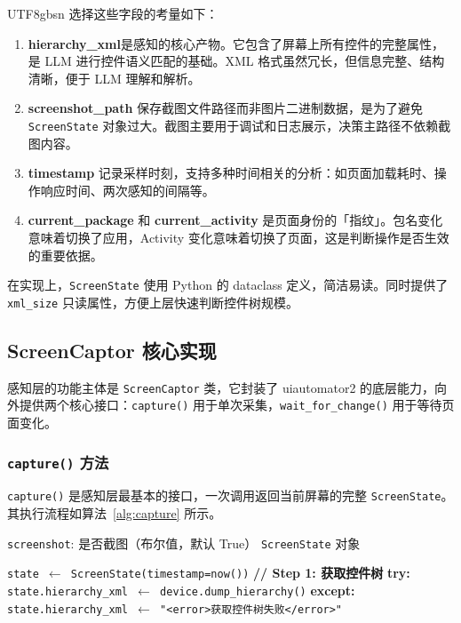 \documentclass{article}
\begin{document}
\begin{CJK}{UTF8}{gbsn}
选择这些字段的考量如下：

\begin{enumerate}[leftmargin=1.5em]
  \item \textbf{hierarchy\_xml}是感知的核心产物。它包含了屏幕上所有控件的完整属性，是 LLM 进行控件语义匹配的基础。XML 格式虽然冗长，但信息完整、结构清晰，便于 LLM 理解和解析。
  \item \textbf{screenshot\_path} 保存截图文件路径而非图片二进制数据，是为了避免 \texttt{ScreenState} 对象过大。截图主要用于调试和日志展示，决策主路径不依赖截图内容。
  \item \textbf{timestamp} 记录采样时刻，支持多种时间相关的分析：如页面加载耗时、操作响应时间、两次感知的间隔等。
  \item \textbf{current\_package} 和 \textbf{current\_activity} 是页面身份的「指纹」。包名变化意味着切换了应用，Activity 变化意味着切换了页面，这是判断操作是否生效的重要依据。
\end{enumerate}

在实现上，\texttt{ScreenState} 使用 Python 的 dataclass 定义，简洁易读。同时提供了 \texttt{xml\_size} 只读属性，方便上层快速判断控件树规模。

\subsection{ScreenCaptor 核心实现}

感知层的功能主体是 \texttt{ScreenCaptor} 类，它封装了 uiautomator2 的底层能力，向外提供两个核心接口：\texttt{capture()} 用于单次采集，\texttt{wait\_for\_change()} 用于等待页面变化。

\subsubsection{\texttt{capture()} 方法}

\texttt{capture()} 是感知层最基本的接口，一次调用返回当前屏幕的完整 \texttt{ScreenState}。其执行流程如算法~\ref{alg:capture} 所示。

\begin{algorithm}[h]
  \caption{\texttt{ScreenCaptor.capture()} 算法}
  \label{alg:capture}
  \begin{algorithmic}[1]
    \REQUIRE \texttt{screenshot}: 是否截图（布尔值，默认 True）
    \ENSURE \texttt{ScreenState} 对象

    \STATE \texttt{state $\leftarrow$ ScreenState(timestamp=now())}
    \STATE \textbf{// Step 1: 获取控件树}
    \STATE \textbf{try:}
    \STATE \quad \texttt{state.hierarchy\_xml $\leftarrow$ device.dump\_hierarchy()}
    \STATE \textbf{except:}
    \STATE \quad \texttt{state.hierarchy\_xml $\leftarrow$ "<error>获取控件树失败</error>"}


\end{algorithmic}
\end{algorithm}
\end{CJK}
\end{document}
